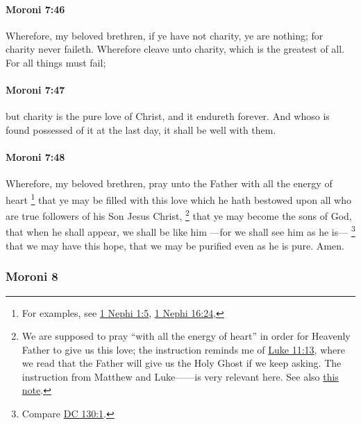 		\paragraph{Moroni 7:46} %
			\label{MORONI-7-46}

			Wherefore, my beloved brethren,
			if ye have not charity, ye are nothing;
			for charity never faileth.
			Wherefore cleave unto charity,
			which is the greatest of all.
			For all things must fail;

		\paragraph{Moroni 7:47} %
			\label{MORONI-7-47}

			but charity is the pure love of Christ,
			and it endureth forever.
			And whoso is found possessed of it at the last day,
			it shall be well with them.

		\paragraph{Moroni 7:48} %
			\label{MORONI-7-48}
			
			Wherefore, my beloved brethren,
			pray unto the Father with all the energy of heart%
				\footnote{%
					For examples, see \hyperref[1NEPHI-1-5]{1 Nephi 1:5}, \hyperref[1NEPHI-16-24]{1 Nephi 16:24}, 
					}
			that ye may be filled with this love
			which he hath bestowed upon all
			who are true followers of his Son Jesus Christ,%
				\footnote{%
					\label{MORONI-7-48-NOTE-pray}%
					We are supposed to pray ``with all the energy of heart'' in order for Heavenly Father to give us this love; the instruction reminds me of \hyperref[LCHRIST-048-L]{Luke 11:13}, where we read that the Father will give us the Holy Ghost if we keep asking. The instruction from Matthew and Luke------is very relevant here. See also \hyperref[LCHRIST-048-participles]{this note}.
					}
			that ye may become the sons of God,
			that when he shall appear, we shall be like him
			---for we shall see him as he is---%
				\footnote{%
					Compare \hyperref[DC130-1]{DC 130:1}.
					}
			that we may have this hope,
			that we may be purified even as he is pure.
			Amen.		
			
	\subsubsection{Moroni 8} %
		\label{MORONI-8}
		
